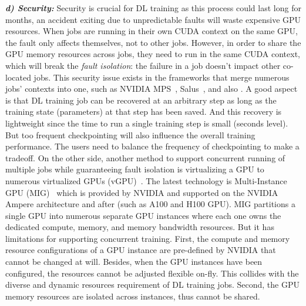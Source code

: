 \textbf{\textit{d) Security:}}
Security is crucial for DL training as this process could last long for months,
an accident exiting due to unpredictable faults will waste expensive GPU resources.
When jobs are running in their own CUDA context on the same GPU,
the fault only affects themselves, not to other jobs.
However, in order to share the GPU memory resources across jobs,
they need to run in the same CUDA context,
which will break the \emph{fault isolation}:
the failure in a job doesn't impact other co-located jobs.
This security issue exists in the frameworks that merge numerous jobs' contexts into one,
such as NVIDIA MPS~\cite{mps}, Salus~\cite{yu2020salus}, and also \oursys{}.
A good aspect is that DL training job can be recovered at an arbitrary step
as long as the training state (parameters) at that step has been saved.
And this recovery is lightweight since the time to run a single training step is small (seconds level).
But too frequent checkpointing will also influence the overall training performance.
The users need to balance the frequency of checkpointing to make a tradeoff.
On the other side, another method to support concurrent running of multiple jobs
while guaranteeing fault isolation is virtualizing a GPU to numerous virtualized GPUs (vGPU)~\cite{vGPU}.
The latest technology is Multi-Instance GPU (MIG)~\cite{mig} which is provided by NVIDIA
and supported on the NVIDIA Ampere architecture and after (such as A100 and H100 GPU).
MIG partitions a single GPU into numerous separate GPU instances
where each one owns the dedicated compute, memory, and memory bandwidth resources.
But it has limitations for supporting concurrent training.
First, the compute and memory resource configurations of a GPU instance are pre-defined by NVIDIA that cannot be changed at will.
Besides, when the GPU instances have been configured, the resources cannot be adjusted flexible on-fly.
This collides with the diverse and dynamic resources requirement of DL training jobs.
Second, the GPU memory resources are isolated across instances, thus cannot be shared.
